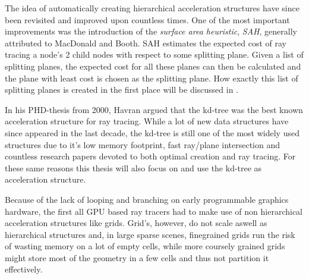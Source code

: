 
The idea of automatically creating hierarchical acceleration
structures have since been revisited and improved upon countless
times. One of the most important improvements was the introduction of
the \textit{surface area heuristic}, \textit{SAH}, generally
attributed to MacDonald and Booth. SAH
estimates the expected cost of ray tracing a node's 2 child nodes with
respect to some splitting plane. Given a list of splitting planes, the
expected cost for all these planes can then be calculated and the
plane with least cost is chosen as the splitting plane. How exactly
this list of splitting planes is created in the first place will be
discussed in .



In his PHD-thesis from 2000, Havran argued that
the kd-tree was the best known acceleration structure for ray
tracing. While a lot of new data structures have since appeared in the
last decade, the kd-tree is still one of the most widely used
structures due to it's low memory footprint, fast ray/plane
intersection and countless research papers devoted to both optimal
creation and ray tracing. For these same reasons this thesis will also
focus on and use the kd-tree as acceleration structure.




Because of the lack of looping and branching on early programmable
graphics hardware, the first all GPU based ray tracers had to make use
of non hierarchical acceleration structures like
grids. Grid's, however, do not scale aswell as
hierarchical structures and, in large sparse scenes, finegrained grids
run the risk of wasting memory on a lot of empty cells, while more
coursely grained grids might store most of the geometry in a few cells
and thus not partition it effectively.


